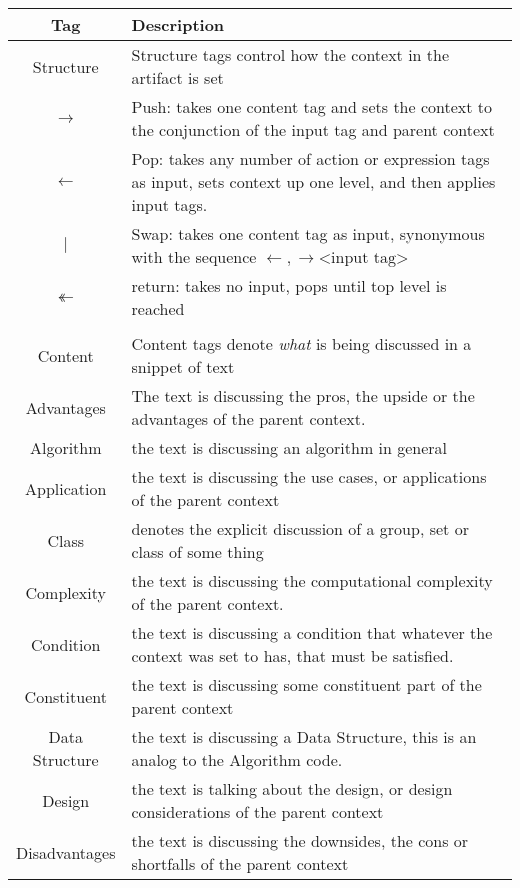 \begin{table}[h!]
  \centering
  \begin{tabular}{c p{1.8\linewidth}}
    Tag & Description \\
    \hline
    \hline

    Structure &  Structure tags control how the context in the artifact is set \\
    \hline
    $\rightarrow$ & Push: takes one content tag and sets the context to the conjunction of the input tag and parent context \\
    $\leftarrow$ & Pop: takes any number of action or expression tags as input, sets context up one level, and then applies input tags.\\
    $|$ & Swap: takes one content tag as input, synonymous with the sequence $\leftarrow, \rightarrow \text{<input tag>}$ \\
    $\twoheadleftarrow$ & return: takes no input, pops until top level is reached \\
\\
    Content & Content tags denote \emph{what} is being discussed in a snippet of text \\
    \hline
    Advantages & The text is discussing the pros, the upside or the advantages of the parent context. \\
    Algorithm & the text is discussing an algorithm in general\\
    Application &  the text is discussing the use cases, or applications of the parent context\\
    Class & denotes the explicit discussion of a group, set or class of some thing\\
    Complexity & the text is discussing the computational complexity of the parent context.\\
    Condition & the text is discussing a condition that whatever the context was set to has, that must be satisfied.\\
    Constituent & the text is discussing some constituent part of the parent context\\
    Data Structure & the text is discussing a Data Structure, this is an analog to the Algorithm code.\\
    Design & the text is talking about the design, or design considerations of the parent context\\
    Disadvantages & the text is discussing the downsides, the cons or shortfalls of the parent context\\

\end{tabular}
\end{table}
